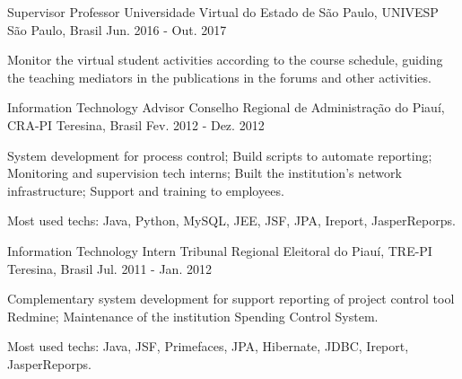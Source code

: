 \begin{cventries}

  \cventry
    {Supervisor Professor} %
    {Universidade Virtual do Estado de São Paulo, UNIVESP} %
    {São Paulo, Brasil} %
    {Jun. 2016 - Out. 2017} %
    {
      \begin{cvitems} %
        \item {Monitor the virtual student activities according to the course schedule, guiding the teaching mediators in the publications in the forums and other activities.}
      \end{cvitems}
    }


  \cventry
    {Information Technology Advisor} %
    {Conselho Regional de Administração do Piauí, CRA-PI} %
    {Teresina, Brasil} %
    {Fev. 2012 - Dez. 2012} %
    {
      \begin{cvitems} %
        \item {System development for process control; Build scripts to automate reporting; Monitoring and supervision tech interns; Built the institution's network infrastructure; Support and training to employees.}
        \item {Most used techs: Java, Python, MySQL, JEE, JSF, JPA, Ireport, JasperReporps.}
      \end{cvitems}
    }


  \cventry
    {Information Technology Intern} %
    {Tribunal Regional Eleitoral do Piauí, TRE-PI} %
    {Teresina, Brasil} %
    {Jul. 2011 - Jan. 2012} %
    {
      \begin{cvitems} %
        \item {Complementary system development for support reporting of project control tool Redmine; Maintenance of the institution Spending Control System.}
        \item {Most used techs: Java, JSF, Primefaces, JPA, Hibernate, JDBC, Ireport, JasperReporps.}
      \end{cvitems}
    }


\end{cventries}
